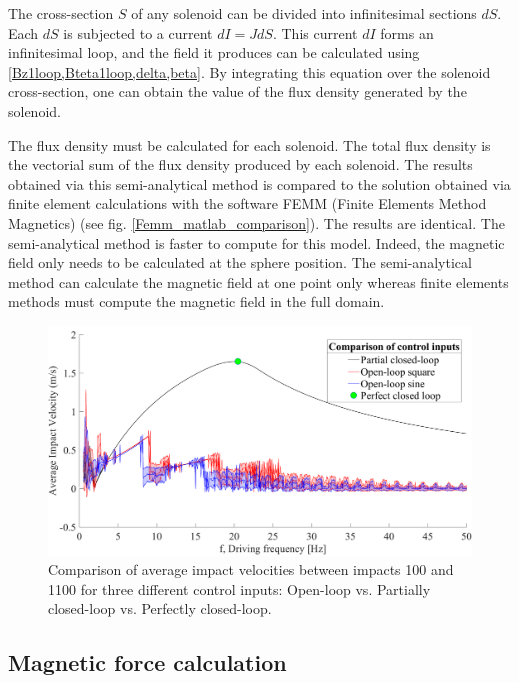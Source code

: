 \documentclass[letterpaper, 10 pt, conference]{ieeeconf}  %
\begin{document}
The cross-section $S$ of any solenoid can be divided into infinitesimal sections $dS$. Each $dS$ is subjected to a current $dI=JdS$. This current $dI$ forms an infinitesimal loop, and the field it produces can be calculated using \cref{Bz1loop,Bteta1loop,delta,beta}. By integrating this equation over the solenoid cross-section, one can obtain the value of the flux density generated by the solenoid.\par
The flux density must be calculated for each solenoid. The total flux density is the vectorial sum of the flux density produced by each solenoid. The results obtained via this semi-analytical method is compared to the solution obtained via finite element calculations with the software FEMM (Finite Elements Method Magnetics)\cite{femm} (see fig. \ref{Femm_matlab_comparison}). The results are identical. The semi-analytical method is faster to compute for this model. Indeed, the magnetic field only needs to be calculated at the sphere position. The semi-analytical method can calculate the magnetic field at one point only whereas finite elements methods must compute the magnetic field in the full domain.

\begin{figure}
	\includegraphics[width=\linewidth]{ComparisonOfControlInputs.pdf}
	\caption[Comparison of impact velocities from three control inputs]{Comparison of average impact velocities between impacts 100 and 1100 for three different control inputs: Open-loop vs. Partially closed-loop vs. Perfectly closed-loop.}
	\label{CLvsOL}
	\vspace{-1.5em}
\end{figure}
\subsection{Magnetic force calculation}
\label{magforce}
\end{document}
